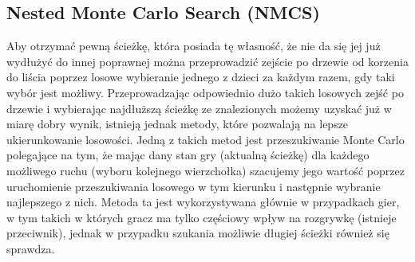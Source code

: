 \documentclass{pracamgr}
\begin{document}
    \subsection{Nested Monte Carlo Search (NMCS)}
     Aby otrzymać pewną ścieżkę, która posiada tę własność, że nie da się jej już wydłużyć do innej poprawnej można przeprowadzić zejście po drzewie
     od korzenia do liścia poprzez losowe wybieranie jednego z dzieci za każdym razem, gdy taki wybór jest możliwy.\newline
     Przeprowadzając odpowiednio dużo takich losowych zejść po drzewie i wybierając najdłuższą ścieżkę ze znalezionych możemy uzyskać już w miarę dobry
     wynik, istnieją jednak metody, które pozwalają na lepsze ukierunkowanie losowości.\newline
     Jedną z takich metod jest przeszukiwanie Monte Carlo polegające na tym, że mając dany stan gry (aktualną ścieżkę) dla każdego możliwego ruchu
     (wyboru kolejnego wierzchołka) szacujemy jego wartość poprzez uruchomienie przeszukiwania losowego w tym kierunku i następnie wybranie najlepszego z nich.
     Metoda ta jest wykorzystywana głównie w przypadkach gier, w tym takich w których gracz ma tylko częściowy wpływ na rozgrywkę (istnieje przeciwnik),
     jednak w przypadku szukania możliwie długiej ścieżki również się sprawdza.
     
\end{document}
